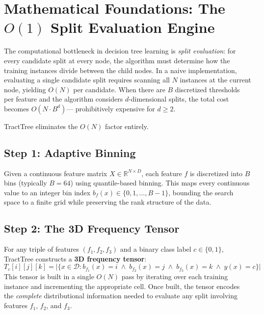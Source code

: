 \documentclass[11pt,a4paper]{article}
\begin{document}
\section{Mathematical Foundations: The $O(1)$ Split Evaluation Engine}
\label{sec:math}

The computational bottleneck in decision tree learning is \emph{split evaluation}: for every candidate split at every node, the algorithm must determine how the training instances divide between the child nodes. In a naive implementation, evaluating a single candidate split requires scanning all $N$ instances at the current node, yielding $O(N)$ per candidate. When there are $B$ discretized thresholds per feature and the algorithm considers $d$-dimensional splits, the total cost becomes $O(N \cdot B^d)$--- prohibitively expensive for $d \geq 2$.

TractTree eliminates the $O(N)$ factor entirely.

\subsection{Step 1: Adaptive Binning}

Given a continuous feature matrix $X \in \mathbb{R}^{N \times D}$, each feature $f$ is discretized into $B$ bins (typically $B = 64$) using quantile-based binning. This maps every continuous value to an integer bin index $b_f(x) \in \{0, 1, \ldots, B-1\}$, bounding the search space to a finite grid while preserving the rank structure of the data.

\subsection{Step 2: The 3D Frequency Tensor}

For any triple of features $(f_1, f_2, f_3)$ and a binary class label $c \in \{0, 1\}$, TractTree constructs a \textbf{3D frequency tensor}:
$$
T_c[i][j][k] = \bigl|\{x \in \mathcal{D} : b_{f_1}(x) = i \;\wedge\; b_{f_2}(x) = j \;\wedge\; b_{f_3}(x) = k \;\wedge\; y(x) = c\}\bigr|
$$
This tensor is built in a single $O(N)$ pass by iterating over each training instance and incrementing the appropriate cell. Once built, the tensor encodes the \emph{complete} distributional information needed to evaluate any split involving features $f_1$, $f_2$, and $f_3$.
\end{document}
